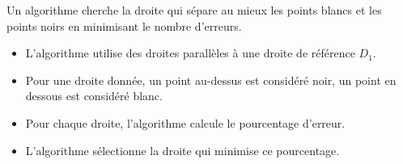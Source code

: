 \begin{minipage}{0.42\textwidth}

		Un algorithme cherche la droite qui sépare au mieux les points blancs et les points noirs en minimisant le nombre d'erreurs.

		\begin{itemize}
			\item L'algorithme utilise des droites parallèles à une droite de référence $D_1$.
			\item Pour une droite donnée, un point au-dessus est considéré noir, un point en dessous est considéré blanc.
			\item Pour chaque droite, l'algorithme calcule le pourcentage d'erreur.
			\item L'algorithme sélectionne la droite qui minimise ce pourcentage.
		\end{itemize}

	\end{minipage}
	\hfill
